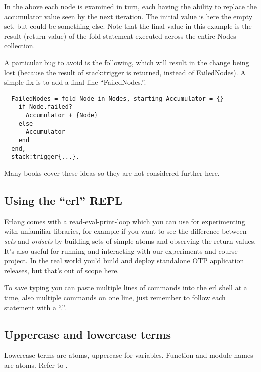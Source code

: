 \documentclass[a4paper]{article}
\begin{document}
In the above each node is examined in turn, each having the ability to replace
the accumulator value seen by the next iteration. The initial value is here
the empty set, but could be something else. Note that the final value in this
example is the result (return value) of the fold statement executed across
the entire Nodes collection.

A particular bug to avoid is the following, which will result in the change
being lost (because the result of stack:trigger is returned, instead of
FailedNodes). A simple fix is to add a final line ``FailedNodes.''.

\begin{verbatim}
  FailedNodes = fold Node in Nodes, starting Accumulator = {}
    if Node.failed?
      Accumulator + {Node}
    else
      Accumulator
    end
  end,
  stack:trigger{...}.
\end{verbatim}

Many books cover these ideas so they are not considered further here.


\subsection{Using the ``erl'' REPL} %
\label{sub:using_the_erl_repl}

Erlang comes with a read-eval-print-loop which you can use for experimenting
with unfamiliar libraries, for example if you want to see the difference
between \emph{sets} and \emph{ordsets} by building sets of simple atoms and
observing the return values. It's also useful for running and interacting with
our experiments and course project. In the real world you'd build and deploy
standalone OTP application releases, but that's out of scope here.

To save typing you can paste multiple lines of commands into the erl shell at
a time, also multiple commands on one line, just remember to follow each
statement with a ``.''.




\subsection{Uppercase and lowercase terms} %
\label{sub:uppercase_and_lowercase_terms}

Lowercase terms are atoms, uppercase for variables. Function and module names
are atoms. Refer to \cite{manual_expressions}.
\end{document}
